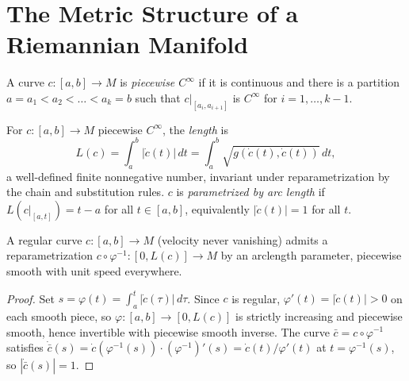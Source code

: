 \section{The Metric Structure of a Riemannian Manifold}

\begin{definition}
  \label{def:pet-ch5-piecewise-smooth-curve}
  \leanok
  A curve $c:[a,b]\to M$ is \emph{piecewise $C^\infty$} if it is continuous and there
  is a partition $a=a_1<a_2<\dots<a_k=b$ such that $c|_{[a_i,a_{i+1}]}$ is $C^\infty$
  for $i=1,\dots,k-1$.
\end{definition}

\begin{definition}
  \label{def:pet-ch5-curve-length}
  \leanok
  For $c:[a,b]\to M$ piecewise $C^\infty$, the \emph{length} is
  \[
    L(c)=\int_a^b|\dot c(t)|\,dt=\int_a^b\sqrt{g(\dot c(t),\dot c(t))}\,dt,
  \]
  a well-defined finite nonnegative number, invariant under reparametrization by the
  chain and substitution rules. $c$ is \emph{parametrized by arc length} if
  $L(c|_{[a,t]})=t-a$ for all $t\in[a,b]$, equivalently $|\dot c(t)|=1$ for all $t$.
\end{definition}

\begin{proposition}
  \label{prop:pet-ch5-arclength-reparametrization}
  \leanok
  A regular curve $c:[a,b]\to M$ (velocity never vanishing) admits a reparametrization
  $c\circ\varphi^{-1}:[0,L(c)]\to M$ by an arclength parameter, piecewise smooth with
  unit speed everywhere.
\end{proposition}
\begin{proof}
  \leanok
  Set $s=\varphi(t)=\int_a^t|\dot c(\tau)|\,d\tau$. Since $c$ is regular,
  $\varphi'(t)=|\dot c(t)|>0$ on each smooth piece, so $\varphi:[a,b]\to[0,L(c)]$ is
  strictly increasing and piecewise smooth, hence invertible with piecewise smooth
  inverse. The curve $\bar c=c\circ\varphi^{-1}$ satisfies
  $\dot{\bar c}(s)=\dot c(\varphi^{-1}(s))\cdot(\varphi^{-1})'(s)
  =\dot c(t)/\varphi'(t)$ at $t=\varphi^{-1}(s)$, so $|\dot{\bar c}(s)|=1$.
\end{proof}

